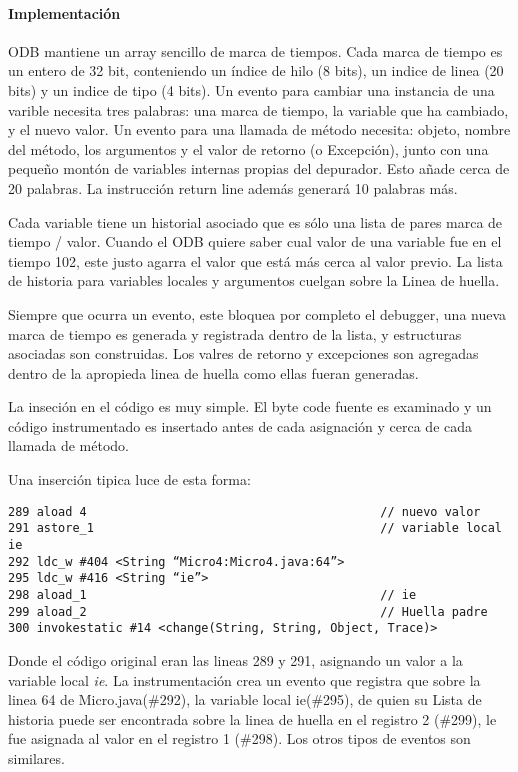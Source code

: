 \documentclass[12pt,legalpaper]{report}
\begin{document}
				\paragraph{Implementación}

ODB mantiene un array sencillo de marca de tiempos.  Cada marca de tiempo es un entero de 32 bit, conteniendo un índice de hilo (8 bits), un indice de linea (20 bits) y un indice de tipo (4 bits).  Un evento para cambiar una instancia de una varible necesita tres palabras: una marca de tiempo, la variable que ha cambiado, y el nuevo valor.  Un evento para una llamada de método necesita: objeto, nombre del método, los argumentos y el valor de retorno (o Excepción), junto con una pequeño montón de variables internas propias del depurador.  Esto añade cerca de 20 palabras.  La instrucción return line además generará 10 palabras más.

Cada variable tiene un historial asociado que es sólo una lista de pares marca de tiempo / valor. Cuando el ODB quiere saber cual valor de una variable fue en el tiempo 102, este justo agarra el valor que está más cerca al valor previo.  La lista de historia para variables locales y argumentos cuelgan sobre la Linea de huella.

Siempre que ocurra un evento, este bloquea por completo el debugger, una nueva marca de tiempo es generada y registrada dentro de la lista, y estructuras asociadas son construidas.  Los valres de retorno y excepciones son agregadas dentro de la apropieda linea de huella como ellas fueran generadas.

La inseción en el código es muy simple.  El byte code fuente es examinado y un código instrumentado es insertado antes de cada asignación y cerca de cada llamada de método.

Una inserción tipica luce de esta forma:

\begin{verbatim}
289 aload 4											// nuevo valor
291 astore_1										// variable local ie
292 ldc_w #404 <String “Micro4:Micro4.java:64”>
295 ldc_w #416 <String “ie”>
298 aload_1											// ie
299 aload_2											// Huella padre
300 invokestatic #14 <change(String, String, Object, Trace)>
\end{verbatim}

Donde el código original eran las lineas 289 y 291, asignando un valor a la variable local \textit{ie}.  La instrumentación crea un evento que registra que sobre la linea 64 de Micro.java(\#292), la variable local ie(\#295), de quien su Lista de historia puede ser encontrada sobre la linea de huella en el registro 2 (\#299), le fue asignada al valor en el registro 1 (\#298).  Los otros tipos de eventos son similares.
\end{document}
